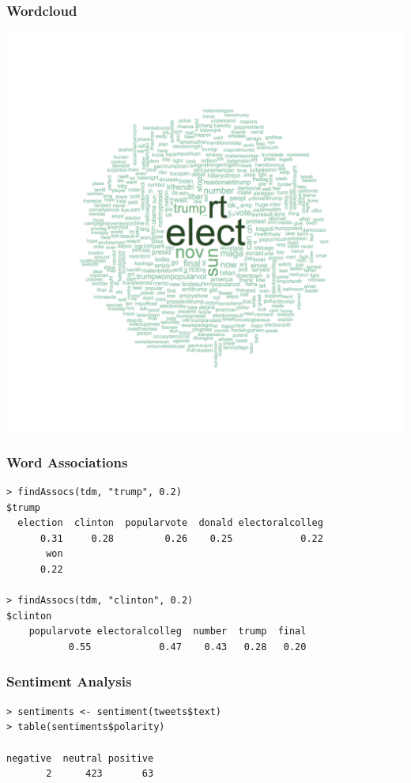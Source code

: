 \documentclass{beamer}
\begin{document}
\begin{frame}
  \frametitle{Wordcloud}
  \center
  \includegraphics[height = \textheight]{wordcloud}
\end{frame}

\begin{frame}[fragile]
  \frametitle{Word Associations}
  \begin{verbatim}
> findAssocs(tdm, "trump", 0.2)
$trump
  election  clinton  popularvote  donald electoralcolleg
      0.31     0.28         0.26    0.25            0.22
       won
      0.22

> findAssocs(tdm, "clinton", 0.2)
$clinton
    popularvote electoralcolleg  number  trump  final
           0.55            0.47    0.43   0.28   0.20
  \end{verbatim}
\end{frame}

\begin{frame}[fragile]
  \frametitle{Sentiment Analysis}
  \begin{verbatim}
> sentiments <- sentiment(tweets$text)
> table(sentiments$polarity)

negative  neutral positive
       2      423       63
  \end{verbatim}
\end{frame}

\end{document}
